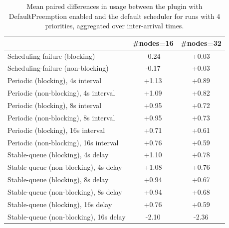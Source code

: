 \begin{table}[t]
\tiny
\setlength{\tabcolsep}{1.2pt}
\renewcommand{\arraystretch}{1.12}
\centering
\caption{Mean paired differences in usage between the plugin with DefaultPreemption enabled and the default scheduler for runs with 4 priorities, aggregated over inter-arrival times.}
\label{tab:usage-defpreempt1-prio4-std0-agg-arrival}
\begin{tabular}{l c c}
\toprule
 & \#nodes=16 & \#nodes=32 \\
\midrule
Scheduling-failure (blocking) & -0.24 & +0.03 \\
Scheduling-failure (non-blocking) & -0.17 & +0.03 \\
Periodic (blocking), 4s interval & +1.13 & +0.89 \\
Periodic (non-blocking), 4s interval & +1.09 & +0.82 \\
Periodic (blocking), 8s interval & +0.95 & +0.72 \\
Periodic (non-blocking), 8s interval & +0.95 & +0.73 \\
Periodic (blocking), 16s interval & +0.71 & +0.61 \\
Periodic (non-blocking), 16s interval & +0.76 & +0.59 \\
Stable-queue (blocking), 4s delay & +1.10 & +0.78 \\
Stable-queue (non-blocking), 4s delay & +1.08 & +0.76 \\
Stable-queue (blocking), 8s delay & +0.94 & +0.67 \\
Stable-queue (non-blocking), 8s delay & +0.94 & +0.68 \\
Stable-queue (blocking), 16s delay & +0.76 & +0.59 \\
Stable-queue (non-blocking), 16s delay & -2.10 & -2.36 \\
\bottomrule
\end{tabular}
\end{table}
